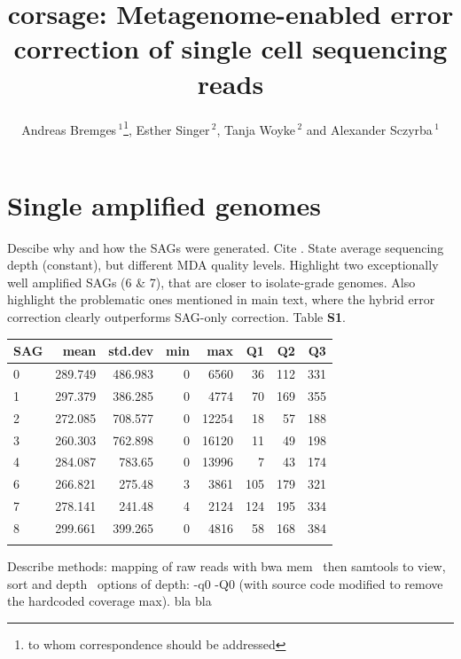 \documentclass{bioinfo2}
\begin{document}
\renewcommand{\thepage}{S\arabic{page}}

\title[Metagenome-enabled error correction]{corsage: Metagenome-enabled error correction of single cell sequencing reads}

\author[Bremges \textit{et~al.}]{Andreas Bremges\,$^{1}$\footnote{to whom correspondence should be addressed}, Esther Singer\,$^{2}$, Tanja Woyke\,$^{2}$ and Alexander Sczyrba\,$^{1}$}

\address{$^{1}$Center for Biotechnology \& Faculty of Technology, Bielefeld University, 33615 Bielefeld, Germany\\
$^{2}$U.S. Department of Energy Joint Genome Institute, Walnut Creek, CA 94598, USA}

\maketitle

\section{Single amplified genomes}

Descibe why and how the SAGs were generated. Cite \citep{scott2}. State average sequencing depth (constant), but different MDA quality levels. Highlight two exceptionally well amplified SAGs (6 \& 7), that are closer to isolate-grade genomes. Also highlight the problematic ones mentioned in main text, where the hybrid error correction clearly outperforms SAG-only correction. Table \textbf{S1}.

\begin{table}[h]
{\footnotesize
\begin{tabular}{lrrrrrrr}
\toprule
SAG  & mean & std.dev & min & max & Q1 & Q2 & Q3 \\
\midrule
0 & 289.749 & 486.983 & 0 & 6560 & 36 & 112 & 331 \\
1 & 297.379 & 386.285 & 0 & 4774 & 70 & 169 & 355 \\
2 & 272.085 & 708.577 & 0 & 12254 & 18 & 57 & 188 \\
3 & 260.303 & 762.898 & 0 & 16120 & 11 & 49 & 198 \\
4 & 284.087 & 783.65 & 0 & 13996 & 7 & 43 & 174 \\
6 & 266.821 & 275.48 & 3 & 3861 & 105 & 179 & 321 \\
7 & 278.141 & 241.48 & 4 & 2124 & 124 & 195 & 334 \\
8 & 299.661 & 399.265 & 0 & 4816 & 58 & 168 & 384 \\
\botrule
\end{tabular}}{Describe methods: mapping of raw reads with bwa mem~\citep{bwamem} then samtools to view, sort and depth~\citep{samtools} options of depth: -q0 -Q0 (with source code modified to remove the hardcoded coverage max).
bla bla}
\end{table}
\end{document}
